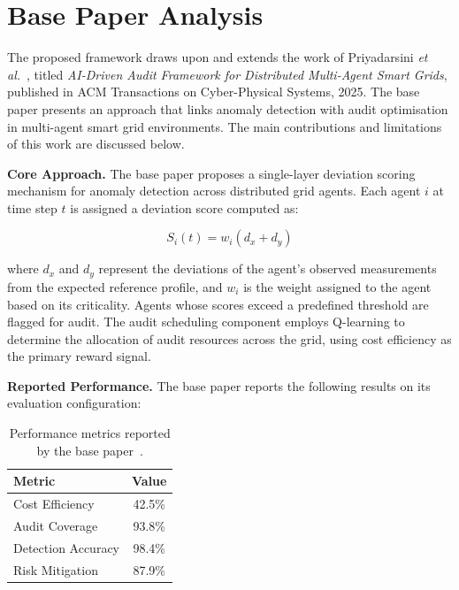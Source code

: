 
\section{Base Paper Analysis}

The proposed framework draws upon and extends the work of Priyadarsini \textit{et al.}~\cite{priyadarsini2025}, titled \textit{AI-Driven Audit Framework for Distributed Multi-Agent Smart Grids}, published in ACM Transactions on Cyber-Physical Systems, 2025. The base paper presents an approach that links anomaly detection with audit optimisation in multi-agent smart grid environments. The main contributions and limitations of this work are discussed below.

\par \vspace{0.35cm}

\noindent
\textbf{Core Approach.}
The base paper proposes a single-layer deviation scoring mechanism for anomaly detection across distributed grid agents. Each agent $i$ at time step $t$ is assigned a deviation score computed as:

\begin{equation}
S_i(t) = w_i \left( d_x + d_y \right)
\label{eq:base_deviation}
\end{equation}

\noindent
where $d_x$ and $d_y$ represent the deviations of the agent's observed measurements from the expected reference profile, and $w_i$ is the weight assigned to the agent based on its criticality. Agents whose scores exceed a predefined threshold are flagged for audit. The audit scheduling component employs Q-learning to determine the allocation of audit resources across the grid, using cost efficiency as the primary reward signal.

\par \vspace{0.35cm}

\noindent
\textbf{Reported Performance.}
The base paper reports the following results on its evaluation configuration:

\begin{table}[H]
\centering
\caption{Performance metrics reported by the base paper~\cite{priyadarsini2025}.}
\label{tab:base_paper_metrics}
\begin{tabular}{|l|c|}
\hline
\textbf{Metric} & \textbf{Value} \\ \hline
Cost Efficiency & 42.5\% \\ \hline
Audit Coverage & 93.8\% \\ \hline
Detection Accuracy & 98.4\% \\ \hline
Risk Mitigation & 87.9\% \\ \hline
\end{tabular}
\end{table}

